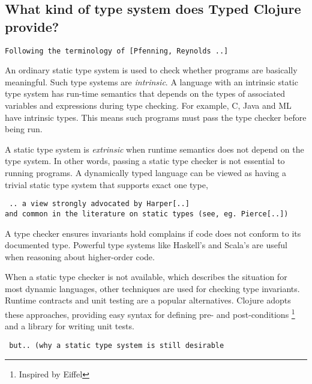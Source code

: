 \subsection{What kind of type system does Typed Clojure provide?}



\begin{verbatim}Following the terminology of [Pfenning, Reynolds ..]\end{verbatim}
An ordinary static type system is used to check whether programs are basically
meaningful. Such type systems are \emph{intrinsic}. A language with an intrinsic
static type system has run-time semantics that depends on the types of associated
variables and expressions during type checking.
For example, C, Java and ML have intrinsic types.
This means such programs must pass the type checker before being run.

A static type system is \emph{extrinsic} when runtime semantics
does not depend on the type system. In other words, passing a static type checker
is not essential to running programs. A dynamically typed language can be viewed
as having a trivial static type system that supports exact one type,
\begin{verbatim} .. a view strongly advocated by Harper[..]
and common in the literature on static types (see, eg. Pierce[..])
\end{verbatim}


A type checker ensures invariants hold complains if code
does not conform to its documented type. Powerful type systems like
Haskell's and Scala's are useful when reasoning about higher-order code.

When a static type checker is not available, which describes the situation
for most dynamic languages, other techniques are used for checking
type invariants. Runtime contracts and unit testing are a popular alternatives.
Clojure adopts these approaches, providing easy syntax for defining pre-
and post-conditions \footnote{Inspired by Eiffel} and a library for writing unit tests.
\begin{verbatim} but.. (why a static type system is still desirable\end{verbatim}

